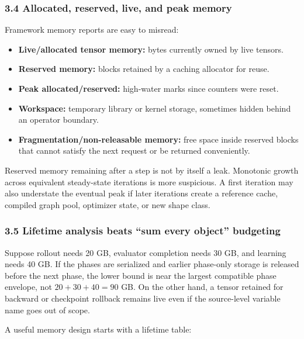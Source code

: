 \documentclass[
  10pt,
  letterpaper,
]{article}
\providecommand{\tightlist}{%
  \setlength{\itemsep}{0pt}\setlength{\parskip}{0pt}}
\begin{document}
\subsubsection{3.4 Allocated, reserved, live, and peak
memory}\label{34-allocated-reserved-live-and-peak-memory}

Framework memory reports are easy to misread:

\begin{itemize}
\tightlist
\item
  \textbf{Live/allocated tensor memory:} bytes currently owned by live
  tensors.
\item
  \textbf{Reserved memory:} blocks retained by a caching allocator for
  reuse.
\item
  \textbf{Peak allocated/reserved:} high-water marks since counters were
  reset.
\item
  \textbf{Workspace:} temporary library or kernel storage, sometimes
  hidden behind an operator boundary.
\item
  \textbf{Fragmentation/non-releasable memory:} free space inside
  reserved blocks that cannot satisfy the next request or be returned
  conveniently.
\end{itemize}

Reserved memory remaining after a step is not by itself a leak.
Monotonic growth across equivalent steady-state iterations is more
suspicious. A first iteration may also understate the eventual peak if
later iterations create a reference cache, compiled graph pool,
optimizer state, or new shape class.

\subsubsection{3.5 Lifetime analysis beats ``sum every object''
budgeting}\label{35-lifetime-analysis-beats-sum-every-object-budgeting}

Suppose rollout needs 20 GB, evaluator completion needs 30 GB, and
learning needs 40 GB. If the phases are serialized and earlier
phase-only storage is released before the next phase, the lower bound is
near the largest compatible phase envelope, not \(20+30+40=90\) GB. On
the other hand, a tensor retained for backward or checkpoint rollback
remains live even if the source-level variable name goes out of scope.

A useful memory design starts with a lifetime table:
\end{document}
